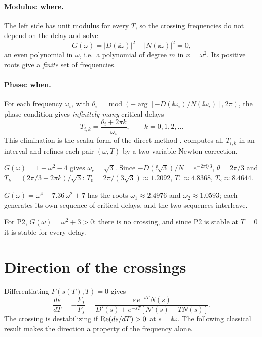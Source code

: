 \paragraph{Modulus: where.} The left side has unit modulus for every $T$,
so the crossing frequencies do not depend on the delay and solve
\begin{equation}
  G(\omega)=|D(\ii\omega)|^2-|N(\ii\omega)|^2=0 ,
  \label{eq:G}
\end{equation}
an even polynomial in $\omega$, i.e.\ a polynomial of degree $m$ in
$x=\omega^2$. Its positive roots give a \emph{finite} set of frequencies.

\paragraph{Phase: when.} For each frequency $\omega_i$, with
$\theta_i=\operatorname{mod}(-\arg[-D(\ii\omega_i)/N(\ii\omega_i)],2\pi)$, the
phase condition gives \emph{infinitely many} critical delays
\begin{equation}
  T_{i,k}=\frac{\theta_i+2\pi k}{\omega_i},\qquad k=0,1,2,\ldots
  \label{eq:Tk}
\end{equation}
This elimination is the scalar form of the direct method
\citep{walton1987,olgac2002,michiels2014}.  computes
all $T_{i,k}$ in an interval and refines each pair $(\omega,T)$ by a
two-variable Newton correction.

\begin{example}[P1]
$G(\omega)=1+\omega^2-4$ gives $\omega_c=\sqrt3$. Since
$-D(\ii\sqrt3)/N=e^{-2\pi\ii/3}$, $\theta=2\pi/3$ and
$T_k=(2\pi/3+2\pi k)/\sqrt3$: $T_0=2\pi/(3\sqrt3)\approx1.2092$,
$T_1\approx4.8368$, $T_2\approx8.4644$.
\end{example}
\begin{example}[P3]
$G(\omega)=\omega^4-7.36\,\omega^2+7$ has the roots $\omega_1\approx2.4976$ and
$\omega_2\approx1.0593$; each generates its own sequence of critical delays,
and the two sequences interleave.
\end{example}
For P2, $G(\omega)=\omega^2+3>0$: there is no crossing, and since P2 is
stable at $T=0$ it is stable for every delay.

\section{Direction of the crossings}

Differentiating $F(s(T),T)=0$ gives
\begin{equation}
  \frac{ds}{dT}=-\frac{F_T}{F_s}
  =\frac{s\,e^{-sT}N(s)}{D'(s)+e^{-sT}[N'(s)-TN(s)]} .
  \label{eq:speed}
\end{equation}
The crossing is destabilizing if $\operatorname{Re}(ds/dT)>0$ at $s=\ii\omega$. The
following classical result \citep{cooke1986} makes the direction a property
of the frequency alone.

